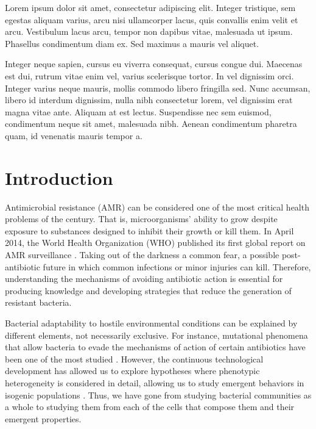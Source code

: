 \documentclass[
  12pt,
  a4paper,
  oneside]{krantz}
\begin{document}
Lorem ipsum dolor sit amet, consectetur adipiscing elit. Integer
tristique, sem egestas aliquam varius, arcu nisi ullamcorper lacus, quis
convallis enim velit et arcu. Vestibulum lacus arcu, tempor non dapibus
vitae, malesuada ut ipsum. Phasellus condimentum diam ex. Sed maximus a
mauris vel aliquet.

Integer neque sapien, cursus eu viverra consequat, cursus congue dui.
Maecenas est dui, rutrum vitae enim vel, varius scelerisque tortor. In
vel dignissim orci. Integer varius neque mauris, mollis commodo libero
fringilla sed. Nunc accumsan, libero id interdum dignissim, nulla nibh
consectetur lorem, vel dignissim erat magna vitae ante. Aliquam at est
lectus. Suspendisse nec sem euismod, condimentum neque sit amet,
malesuada nibh. Aenean condimentum pharetra quam, id venenatis mauris
tempor a.

\mainmatter

\hypertarget{introduction}{%
\chapter*{Introduction}\label{introduction}}


Antimicrobial resistance (AMR) can be considered one of the most
critical health problems of the century. That is, microorganisms'
ability to grow despite exposure to substances designed to inhibit their
growth or kill them. In April 2014, the World Health Organization (WHO)
published its first global report on AMR surveillance
\citep{EditorialBoard2014}. Taking out of the darkness a common fear, a
possible post-antibiotic future in which common infections or minor
injuries can kill. Therefore, understanding the mechanisms of avoiding
antibiotic action is essential for producing knowledge and developing
strategies that reduce the generation of resistant bacteria.

Bacterial adaptability to hostile environmental conditions can be
explained by different elements, not necessarily exclusive. For
instance, mutational phenomena that allow bacteria to evade the
mechanisms of action of certain antibiotics have been one of the most
studied \citep{dever1991, andersson2005}. However, the continuous
technological development has allowed us to explore hypotheses where
phenotypic heterogeneity is considered in detail, allowing us to study
emergent behaviors in isogenic populations \citep{ackermann2015}. Thus, we
have gone from studying bacterial communities as a whole to studying
them from each of the cells that compose them and their emergent
properties.
\end{document}
